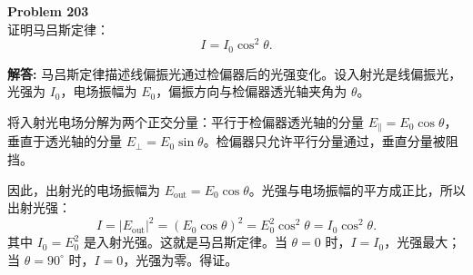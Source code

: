 \documentclass[12pt, a4paper, oneside]{ctexart}
\newenvironment{solution}{\par\noindent\textbf{解答:}\quad}{\par}
\begin{document}
\begin{mdframed}[backgroundcolor=gray!10, linewidth=0pt]
    \textbf{Problem 203} \\
    证明马吕斯定律：
    \[
    I = I_0 \cos^2\theta.
    \]
\end{mdframed}
\begin{solution}
    马吕斯定律描述线偏振光通过检偏器后的光强变化。设入射光是线偏振光，光强为 $I_0$，电场振幅为 $E_0$，偏振方向与检偏器透光轴夹角为 $\theta$。

    将入射光电场分解为两个正交分量：平行于检偏器透光轴的分量 $E_{\parallel} = E_0 \cos\theta$，垂直于透光轴的分量 $E_{\perp} = E_0 \sin\theta$。检偏器只允许平行分量通过，垂直分量被阻挡。

    因此，出射光的电场振幅为 $E_{\text{out}} = E_0 \cos\theta$。光强与电场振幅的平方成正比，所以出射光强：
    \[
    I = |E_{\text{out}}|^2 = (E_0 \cos\theta)^2 = E_0^2 \cos^2\theta = I_0 \cos^2\theta.
    \]
    其中 $I_0 = E_0^2$ 是入射光强。这就是马吕斯定律。当 $\theta = 0$ 时，$I = I_0$，光强最大；当 $\theta = 90^\circ$ 时，$I = 0$，光强为零。得证。
\end{solution}
\end{document}
